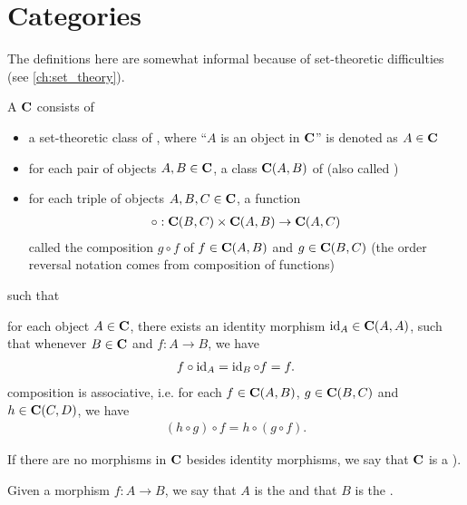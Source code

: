 \section{Categories}\label{sec:categories}

\begin{note}
  The definitions here are somewhat informal because of set-theoretic difficulties (see \cref{ch:set_theory}).
\end{note}

\begin{definition}\label{def:category}\cite[definition 1.1.1]{Leinster2014}
  A  $\operatorname{\mathbf{C}}$ consists of
  \begin{itemize}
    \item a set-theoretic class of , where \enquote{$A$ is an object in $\operatorname{\mathbf{C}}$} is denoted as $A \in \operatorname{\mathbf{C}}$
    \item for each pair of objects $A, B \in \operatorname{\mathbf{C}}$, a class ${\operatorname{\mathbf{C}}}(A, B)$ of  (also called )
    \item for each triple of objects $A, B, C \in \operatorname{\mathbf{C}}$, a function
    \begin{align*}
      \circ: {\operatorname{\mathbf{C}}}(B, C) \times {\operatorname{\mathbf{C}}}(A, B) \to {\operatorname{\mathbf{C}}}(A, C)
    \end{align*}
    called the composition $g \circ f$ of $f \in {\operatorname{\mathbf{C}}}(A, B)$ and $g \in {\operatorname{\mathbf{C}}}(B, C)$ (the order reversal notation comes from composition of functions)
  \end{itemize}
  such that
  \begin{description}
     for each object $A \in \operatorname{\mathbf{C}}$, there exists an identity morphism $\operatorname{id}_A \in {\operatorname{\mathbf{C}}}(A, A)$, such that whenever $B \in \operatorname{\mathbf{C}}$ and $f: A \to B$, we have
    \begin{align*}
      f \circ \operatorname{id}_A = \operatorname{id}_B \circ f = f.
    \end{align*}
     composition is associative, i.e. for each $f \in {\operatorname{\mathbf{C}}}(A, B)$, $g \in {\operatorname{\mathbf{C}}}(B, C)$ and $h \in {\operatorname{\mathbf{C}}}(C, D)$, we have
    \begin{align*}
      (h \circ g) \circ f = h \circ (g \circ f).
    \end{align*}
  \end{description}

  If there are no morphisms in $\operatorname{\mathbf{C}}$ besides identity morphisms, we say that $\operatorname{\mathbf{C}}$ is a  \cite[example 1.1.18(b]{Leinster2014}).

  Given a morphism $f: A \to B$, we say that $A$ is the  and that $B$ is the .
\end{definition}

